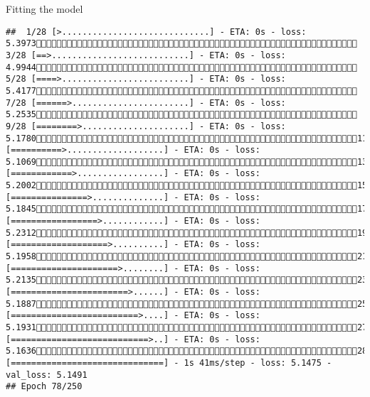\documentclass[
  ignorenonframetext,
]{beamer}
\begin{document}
\begin{frame}[fragile]{Fitting the model}
\begin{verbatim}
##  1/28 [>.............................] - ETA: 0s - loss: 5.3973 3/28 [==>...........................] - ETA: 0s - loss: 4.9944 5/28 [====>.........................] - ETA: 0s - loss: 5.4177 7/28 [======>.......................] - ETA: 0s - loss: 5.2535 9/28 [========>.....................] - ETA: 0s - loss: 5.178011/28 [==========>...................] - ETA: 0s - loss: 5.106913/28 [============>.................] - ETA: 0s - loss: 5.200215/28 [===============>..............] - ETA: 0s - loss: 5.184517/28 [=================>............] - ETA: 0s - loss: 5.231219/28 [===================>..........] - ETA: 0s - loss: 5.195821/28 [=====================>........] - ETA: 0s - loss: 5.213523/28 [=======================>......] - ETA: 0s - loss: 5.188725/28 [=========================>....] - ETA: 0s - loss: 5.193127/28 [===========================>..] - ETA: 0s - loss: 5.163628/28 [==============================] - 1s 41ms/step - loss: 5.1475 - val_loss: 5.1491
## Epoch 78/250

\end{verbatim}
\end{frame}
\end{document}
